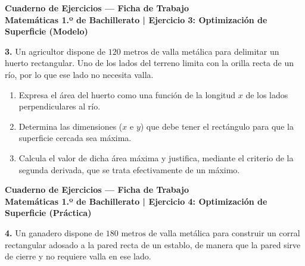 \documentclass[11pt,a4paper]{article}
\begin{document}
\begin{center}
    {\LARGE \textbf{Cuaderno de Ejercicios — Ficha de Trabajo}}\\[4pt]
    {\large \textbf{Matemáticas 1.º de Bachillerato | Ejercicio 3: Optimización de Superficie (Modelo)}}
\end{center}

\vspace{0.8cm}
\noindent\textbf{3.} Un agricultor dispone de $120\text{ metros}$ de valla metálica para delimitar un huerto rectangular. Uno de los lados del terreno limita con la orilla recta de un río, por lo que ese lado no necesita valla.

\vspace{0.3cm}
\begin{enumerate}[label=\textbf{\alph*)}, leftmargin=2em, itemsep=12pt]
    \item Expresa el área del huerto como una función de la longitud $x$ de los lados perpendiculares al río.
    \item Determina las dimensiones ($x$ e $y$) que debe tener el rectángulo para que la superficie cercada sea máxima.
    \item Calcula el valor de dicha área máxima y justifica, mediante el criterio de la segunda derivada, que se trata efectivamente de un máximo.
\end{enumerate}

\newpage

\begin{center}
    {\LARGE \textbf{Cuaderno de Ejercicios — Ficha de Trabajo}}\\[4pt]
    {\large \textbf{Matemáticas 1.º de Bachillerato | Ejercicio 4: Optimización de Superficie (Práctica)}}
\end{center}

\vspace{0.8cm}
\noindent\textbf{4.} Un ganadero dispone de $180\text{ metros}$ de valla metálica para construir un corral rectangular adosado a la pared recta de un establo, de manera que la pared sirve de cierre y no requiere valla en ese lado.
\end{document}
